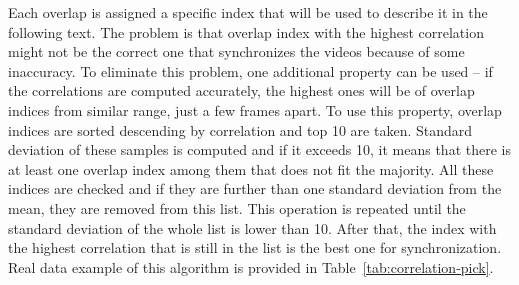 Each overlap is assigned a specific index that will be used to describe it in the following text. The problem is that overlap index with the highest correlation might not be the correct one that synchronizes the videos because of some inaccuracy. To eliminate this problem, one additional property can be used -- if the correlations are computed accurately, the highest ones will be of overlap indices from similar range, just a few frames apart. To use this property, overlap indices are sorted descending by correlation and top 10 are taken. Standard deviation of these samples is computed and if it exceeds 10, it means that there is at least one overlap index among them that does not fit the majority. All these indices are checked and if they are further than one standard deviation from the mean, they are removed from this list. This operation is repeated until the standard deviation of the whole list is lower than 10. After that, the index with the highest correlation that is still in the list is the best one for synchronization. Real data example of this algorithm is provided in Table~\ref{tab:correlation-pick}.

